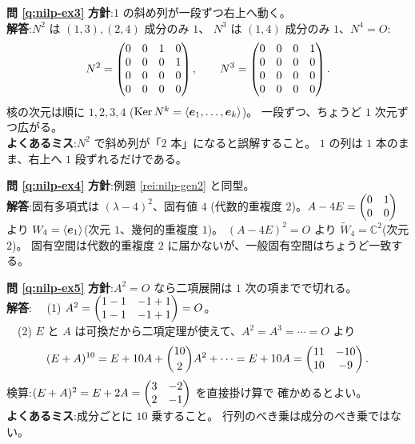\bigskip
\noindent\textbf{問 \ref{q:nilp-ex3}}\quad
\textbf{方針}:$1$ の斜め列が一段ずつ右上へ動く。\\
\textbf{解答}:$N^2$ は $(1,3), (2,4)$ 成分のみ $1$、
$N^3$ は $(1,4)$ 成分のみ $1$、$N^4 = O$:
\[
N^2 = \begin{pmatrix}0 & 0 & 1 & 0 \\ 0 & 0 & 0 & 1 \\ 0 & 0 & 0 & 0 \\ 0 & 0 & 0 & 0\end{pmatrix},
\qquad
N^3 = \begin{pmatrix}0 & 0 & 0 & 1 \\ 0 & 0 & 0 & 0 \\ 0 & 0 & 0 & 0 \\ 0 & 0 & 0 & 0\end{pmatrix}.
\]
核の次元は順に $1, 2, 3, 4$
($\mathrm{Ker}\,N^k = \langle \bm{e}_1, \dots, \bm{e}_k \rangle$)。
一段ずつ、ちょうど $1$ 次元ずつ広がる。\\
\textbf{よくあるミス}:$N^2$ で斜め列が「$2$ 本」になると誤解すること。
$1$ の列は $1$ 本のまま、右上へ $1$ 段ずれるだけである。

\bigskip
\noindent\textbf{問 \ref{q:nilp-ex4}}\quad
\textbf{方針}:例題 \ref{rei:nilp-gen2} と同型。\\
\textbf{解答}:固有多項式は $(\lambda - 4)^2$、固有値 $4$
(代数的重複度 $2$)。$A - 4E = \begin{pmatrix}0 & 1 \\ 0 & 0\end{pmatrix}$ より
$W_4 = \langle \bm{e}_1 \rangle$(次元 $1$、幾何的重複度 $1$)。
$(A - 4E)^2 = O$ より $\widetilde{W}_4 = \mathbb{C}^2$(次元 $2$)。
固有空間は代数的重複度 $2$ に届かないが、一般固有空間はちょうど一致する。

\bigskip
\noindent\textbf{問 \ref{q:nilp-ex5}}\quad
\textbf{方針}:$A^2 = O$ なら二項展開は $1$ 次の項までで切れる。\\
\textbf{解答}:
　(1) $A^2 = \begin{pmatrix}1 - 1 & -1 + 1 \\ 1 - 1 & -1 + 1\end{pmatrix} = O$。\\
　(2) $E$ と $A$ は可換だから二項定理が使えて、$A^2 = A^3 = \cdots = O$ より
\[
(E + A)^{10} = E + 10A + \binom{10}{2}A^2 + \cdots = E + 10A
= \begin{pmatrix}11 & -10 \\ 10 & -9\end{pmatrix}.
\]
検算:$(E + A)^2 = E + 2A = \begin{pmatrix}3 & -2 \\ 2 & -1\end{pmatrix}$ を直接掛け算で
確かめるとよい。\\
\textbf{よくあるミス}:成分ごとに $10$ 乗すること。
行列のべき乗は成分のべき乗ではない。

